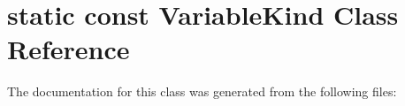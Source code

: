 \hypertarget{classstatic_01const_01VariableKind}{}\section{static const Variable\+Kind Class Reference}
\label{classstatic_01const_01VariableKind}


The documentation for this class was generated from the following files\+: